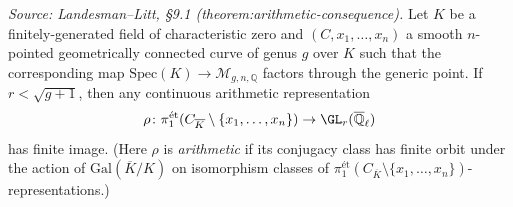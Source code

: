 
\begin{theorem}
  \label{theorem:arithmetic-consequence}
  \textit{Source: Landesman--Litt, §9.1 (theorem:arithmetic-consequence).}
  Let $K$ be a finitely-generated field of characteristic zero and
  $(C, x_1, \ldots, x_n)$ a smooth $n$-pointed geometrically connected curve of
  genus $g$ over $K$ such that the corresponding map
  $\mathrm{Spec}(K) \to \mathcal{M}_{g,n,\mathbb{Q}}$ factors through the
  generic point.
  If $r < \sqrt{g+1}$, then any continuous arithmetic representation
  \[
    \rho\colon \pi_1^{\text{\'et}}(C_{\overline{K}} \setminus \{x_1, \ldots, x_n\})
    \to \GL_r(\overline{\mathbb{Q}}_\ell)
  \]
  has finite image.
  (Here $\rho$ is \emph{arithmetic} if its conjugacy class has finite orbit
  under the action of $\mathrm{Gal}(\overline{K}/K)$ on isomorphism classes of
  $\pi_1^{\text{\'et}}(C_{\overline{K}} \setminus \{x_1, \ldots, x_n\})$-representations.)
\end{theorem}

